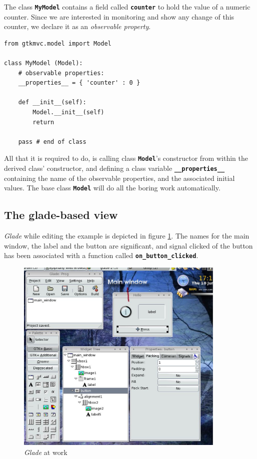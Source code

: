 \documentclass{article}
\newcommand{\appl}[1]{\textsl{#1}\xspace}
\newcommand{\glade}{\appl{Glade}}
\newcommand{\codename}[1]{\texttt{\bfseries \textcolor {codecolor}{#1}}\xspace}
\newcommand{\codesize}{\small \color{codecolor}}
\begin{document}
The class \codename{MyModel} contains a field called
\codename{counter} to hold the value of a numeric counter. Since we
are interested in monitoring and show any change of this counter, we
declare it as an \emph{observable property}.


{ \codesize 
\begin{verbatim}   
from gtkmvc.model import Model

class MyModel (Model):
    # observable properties:
    __properties__ = { 'counter' : 0 }

    def __init__(self):
        Model.__init__(self)
        return

    pass # end of class
\end{verbatim}
} 

All that it is required to do, is calling class \codename{Model}'s
constructor from within the derived class' constructor, and defining a
class variable \codename{\_\_properties\_\_} containing the name of the
observable properties, and the associated initial values. The base
class \codename{Model} will do all the boring work automatically.



\subsection{The glade-based view}
\glade while editing the example is depicted in figure
\ref{fig:glade}. The names for the main window, the label and the
button are significant, and signal clicked of the button has been
associated with a function called \codename{on\_button\_clicked}.

\begin{figure}[htbp]
\begin{center}
\includegraphics[width=10cm]{eps/glade.eps}
\caption{\label{fig:glade}\glade at work}
\end{center}
\end{figure}
\end{document}
